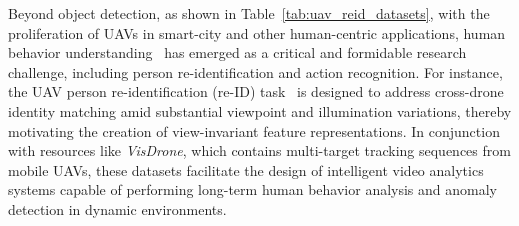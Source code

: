 Beyond object detection, as shown in Table~\ref{tab:uav_reid_datasets}, with the proliferation of UAVs in smart-city and other human-centric applications, human behavior understanding~\cite{li2021uav} has emerged as a critical and formidable research challenge, including person re-identification and action recognition. For instance, the UAV person re-identification (re-ID) task~\cite{albaluchi2025uav} is designed to address cross-drone identity matching amid substantial viewpoint and illumination variations, thereby motivating the creation of view-invariant feature representations. In conjunction with resources like \textit{VisDrone}, which contains multi-target tracking sequences from mobile UAVs, these datasets facilitate the design of intelligent video analytics systems capable of performing long-term human behavior analysis and anomaly detection in dynamic environments.


